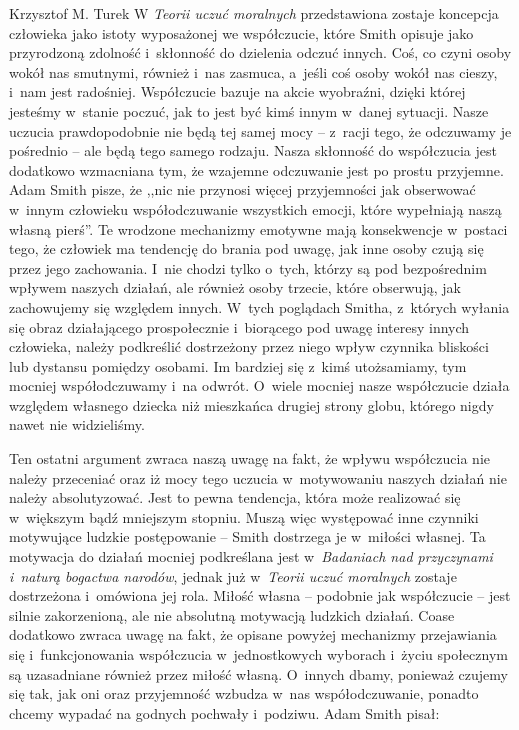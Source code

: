 \begin{artplenv}{Krzysztof M. Turek}
W \textit{Teorii uczuć moralnych} przedstawiona zostaje koncepcja człowieka jako istoty wyposażonej we współczucie,
które Smith opisuje jako przyrodzoną zdolność i~skłonność do dzielenia odczuć innych. Coś, co czyni osoby wokół nas
smutnymi, również i~nas zasmuca, a~jeśli coś osoby wokół nas cieszy, i~nam jest radośniej. Współczucie bazuje na akcie
wyobraźni, dzięki której jesteśmy w~stanie poczuć, jak to jest być kimś innym w~danej sytuacji. Nasze uczucia
prawdopodobnie nie będą tej samej mocy -- z~racji tego, że odczuwamy je pośrednio -- ale będą tego samego rodzaju. Nasza
skłonność do współczucia jest dodatkowo wzmacniana tym, że wzajemne odczuwanie jest po prostu przyjemne. Adam Smith
\parencite*[s.~9]{smith_theory_2005}
pisze, że ,,nic nie przynosi więcej przyjemności jak obserwować w~innym człowieku
współodczuwanie wszystkich emocji, które wypełniają naszą własną pierś''. Te wrodzone mechanizmy emotywne mają
konsekwencje w~postaci tego, że człowiek ma tendencję do brania pod uwagę, jak inne osoby czują się przez jego
zachowania. I~nie chodzi tylko o~tych, którzy są pod bezpośrednim wpływem naszych działań, ale również osoby trzecie,
które obserwują, jak zachowujemy się względem innych. W~tych poglądach Smitha, z~których wyłania się obraz działającego
prospołecznie i~biorącego pod uwagę interesy innych człowieka, należy podkreślić dostrzeżony przez niego wpływ czynnika
bliskości lub dystansu pomiędzy osobami. Im bardziej się z~kimś utożsamiamy, tym mocniej współodczuwamy i~na
odwrót. O~wiele mocniej nasze współczucie działa względem własnego dziecka niż mieszkańca drugiej strony globu, którego nigdy
nawet nie widzieliśmy.

Ten ostatni argument zwraca naszą uwagę na fakt, że wpływu współczucia nie należy przeceniać oraz iż mocy tego
uczucia w~motywowaniu naszych działań nie należy absolutyzować. Jest to pewna tendencja, która może realizować się w~większym
bądź mniejszym stopniu. Muszą więc występować inne czynniki motywujące ludzkie postępowanie -- Smith dostrzega
je w~miłości własnej. Ta motywacja do działań mocniej podkreślana jest w~\textit{Badaniach nad przyczynami i~naturą bogactwa
narodów}, jednak już w~\textit{Teorii uczuć moralnych }zostaje dostrzeżona i~omówiona jej rola.
Miłość własna -- podobnie jak współczucie -- jest silnie zakorzenioną, ale nie absolutną motywacją ludzkich działań. Coase
\parencite*[s.~9]{coase_adam_1976}
dodatkowo zwraca uwagę na fakt, że opisane powyżej mechanizmy przejawiania
się i~funkcjonowania współczucia w~jednostkowych wyborach i~życiu społecznym są uzasadniane również przez miłość
własną. O~innych dbamy, ponieważ czujemy się tak, jak oni oraz przyjemność wzbudza w~nas współodczuwanie, ponadto chcemy wypadać
na godnych pochwały i~podziwu. Adam Smith
\parencite[s.~69]{smith_theory_2005}
pisał: 


\end{artplenv}
